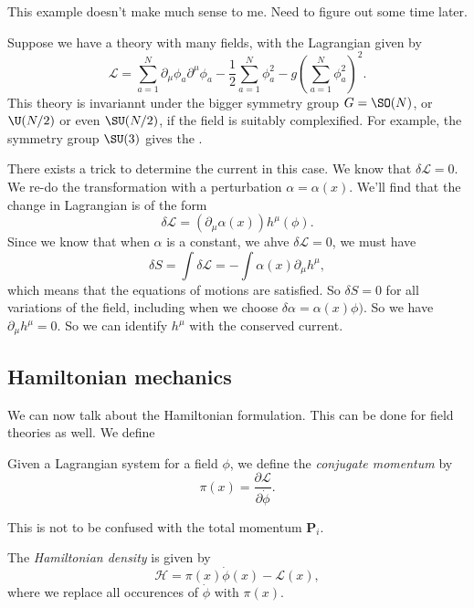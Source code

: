 \documentclass[a4paper]{article}
\begin{document}
\begin{own}
  This example doesn't make much sense to me. Need to figure out some time later.
\end{own}
\begin{eg}
  Suppose we have a theory with many fields, with the Lagrangian given by
  \[
    \mathcal{L} = \sum_{a = 1}^N \partial_\mu \phi_a \partial^\mu \phi_a - \frac{1}{2} \sum_{a = 1}^N \phi_a^2 - g \left(\sum_{a = 1}^N \phi_a^2\right)^2.
  \]
  This theory is invariannt under the bigger symmetry group $G = \SO(N)$, or $\U(N/2)$ or even $\SU(N/2)$, if the field is suitably complexified. For example, the symmetry group $\SU(3)$ gives the .

  There exists a trick to determine the current in this case. We know that $\delta \mathcal{L} = 0$. We re-do the transformation with a perturbation $\alpha = \alpha(x)$. We'll find that the change in Lagrangian is of the form
  \[
    \delta \mathcal{L} = (\partial_\mu \alpha(x)) h^\mu(\phi).
  \]
  Since we know that when $\alpha$ is a constant, we ahve $\delta \mathcal{L} = 0$, we must have
  \[
    \delta S = \int \delta \mathcal{L} = - \int \alpha(x) \partial_\mu h^\mu,
  \]
  which means that the equations of motions are satisfied. So $\delta S = 0$ for all variations of the field, including when we choose $\delta \alpha = \alpha(x) \phi)$. So we have $\partial_\mu h^\mu = 0$. So we can identify $h^\mu$ with the conserved current.
\end{eg}

\subsection{Hamiltonian mechanics}
We can now talk about the Hamiltonian formulation. This can be done for field theories as well. We define
\begin{defi}
  Given a Lagrangian system for a field $\phi$, we define the \emph{conjugate momentum} by
  \[
    \pi(x) = \frac{\partial \mathcal{L}}{\partial \dot{\phi}}.
  \]
\end{defi}
This is not to be confused with the total momentum $\mathbf{P}_i$.

\begin{defi}
  The \emph{Hamiltonian density} is given by
  \[
    \mathcal{H} = \pi(x) \dot{\phi}(x) - \mathcal{L}(x),
  \]
  where we replace all occurences of $\dot{\phi}$ with $\pi(x)$.
\end{defi}
\end{document}
